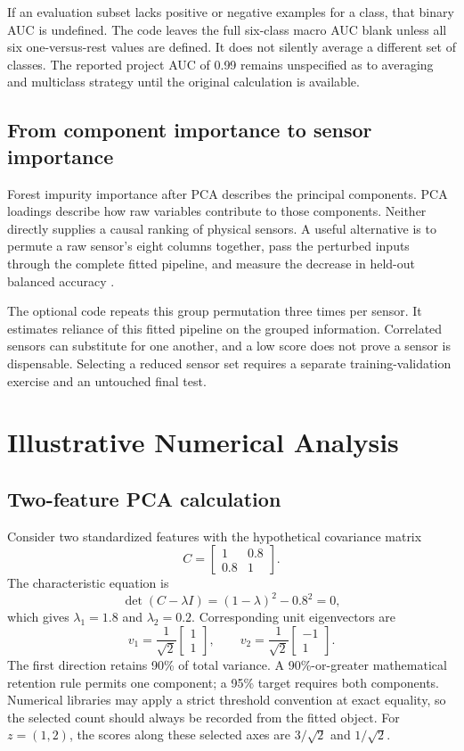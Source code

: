 \documentclass[11pt,a4paper]{article}
\newcommand{\sectionpage}[1]{\clearpage\section{#1}}
\begin{document}
If an evaluation subset lacks positive or negative examples for a class, that binary AUC is undefined. The code leaves the full six-class macro AUC blank unless all six one-versus-rest values are defined. It does not silently average a different set of classes. The reported project AUC of 0.99 remains unspecified as to averaging and multiclass strategy until the original calculation is available.

\subsection{From component importance to sensor importance}
Forest impurity importance after PCA describes the principal components. PCA loadings describe how raw variables contribute to those components. Neither directly supplies a causal ranking of physical sensors. A useful alternative is to permute a raw sensor's eight columns together, pass the perturbed inputs through the complete fitted pipeline, and measure the decrease in held-out balanced accuracy \cite{permutation}.

The optional code repeats this group permutation three times per sensor. It estimates reliance of this fitted pipeline on the grouped information. Correlated sensors can substitute for one another, and a low score does not prove a sensor is dispensable. Selecting a reduced sensor set requires a separate training-validation exercise and an untouched final test.

\sectionpage{Illustrative Numerical Analysis}
\subsection{Two-feature PCA calculation}
Consider two standardized features with the hypothetical covariance matrix
\begin{equation}
C=\begin{bmatrix}1&0.8\\0.8&1\end{bmatrix}.
\end{equation}
The characteristic equation is
\begin{equation}
\det(C-\lambda I)=(1-\lambda)^2-0.8^2=0,
\end{equation}
which gives $\lambda_1=1.8$ and $\lambda_2=0.2$. Corresponding unit eigenvectors are
\begin{equation}
v_1=\frac{1}{\sqrt2}\begin{bmatrix}1\\1\end{bmatrix},\qquad
v_2=\frac{1}{\sqrt2}\begin{bmatrix}-1\\1\end{bmatrix}.
\end{equation}
The first direction retains 90\% of total variance. A 90\%-or-greater mathematical retention rule permits one component; a 95\% target requires both components. Numerical libraries may apply a strict threshold convention at exact equality, so the selected count should always be recorded from the fitted object. For $z=(1,2)$, the scores along these selected axes are $3/\sqrt2$ and $1/\sqrt2$.
\end{document}
